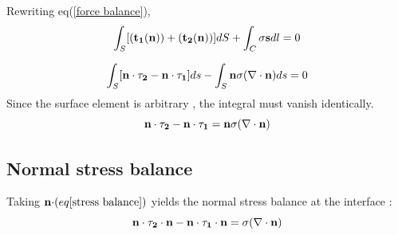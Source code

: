 \documentclass{article}
\begin{document}
Rewriting eq(\ref {force balance}), 
\begin{equation*}
\int_S [{\bf(t_{1}(n))} + {\bf(t_{2}(n))}] dS + \int_C \sigma {\bf s} dl = 0
\end{equation*}

\begin{equation}
\int_ S [{\bf n \cdot \tau_{2}} - {\bf n\cdot \tau_{1}}]ds - \int_S{\bf n }\sigma {\bf (\nabla \cdot n)} ds = 0
\end{equation}
Since the surface element is arbitrary , the integral must vanish identically.
\begin{equation}
\label{stress balance}
{\bf {\bf n \cdot \tau_{2}} - {\bf n\cdot \tau_{1}} = {\bf n}\sigma {\bf (\nabla \cdot n)}}
\end{equation}
\subsection{Normal stress balance}
Taking ${\bf n \cdot}(eq {\ref {stress balance}})$  yields the normal stress balance at the interface :
\begin{equation}
\label{normalbal}
{\bf n \cdot \tau_{2} \cdot n} - {\bf n\cdot \tau_{1} \cdot n} = \sigma {\bf (\nabla \cdot n)}
\end{equation}
\end{document}
